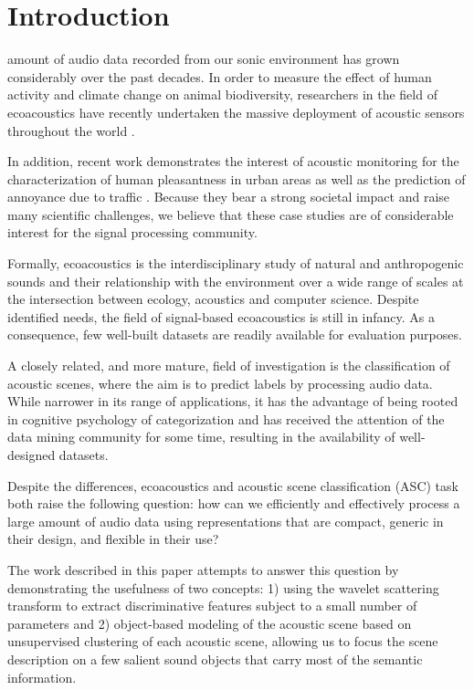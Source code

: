 \documentclass[journal]{IEEEtran}
\begin{document}
\section{Introduction}

 amount of audio data recorded from our sonic environment has grown considerably over the past decades.
In order to measure the effect of human activity and climate change on animal biodiversity, researchers in the field of ecoacoustics \cite{ECOACOUSTICS2014, krause} have recently undertaken the massive deployment of acoustic sensors throughout the world \cite{warren2006urban, NessSST13, stowell13a, stowell13b}. 

In addition, recent work demonstrates the interest of acoustic monitoring for the characterization of human pleasantness in urban areas \cite{lafayPartI, guyot2005urban, ricciardi2015sound} as well as the prediction of annoyance due to traffic \cite{gloaguen}.
Because they bear a strong societal impact and raise many scientific challenges, we believe that these case studies are of considerable interest for the signal processing community.

Formally, ecoacoustics is the interdisciplinary study of natural and anthropogenic sounds and their relationship with the environment over a wide range of scales at the intersection between ecology, acoustics and computer science. Despite identified needs, the field of signal-based ecoacoustics is still in infancy.
As a consequence, few well-built datasets are readily available for evaluation purposes.

A closely related, and more mature, field of investigation is the classification of acoustic scenes, where the aim is to predict labels by processing audio data.
While narrower in its range of applications, it has the advantage of being rooted in cognitive psychology of categorization \cite{dubois2006cognitive, maffiolo_caracterisation_1999, guastavino_ideal_2006} and has received the attention of the data mining community for some time, resulting in the availability of well-designed datasets.

Despite the differences, ecoacoustics and acoustic scene classification (ASC) task both raise the following question: how can we efficiently and effectively process a large amount of audio data using representations that are compact, generic in their design, and flexible in their use?

The work described in this paper attempts to answer this question by demonstrating the usefulness of two concepts: 1) using the wavelet scattering transform to extract discriminative features subject to a small number of parameters and 2) object-based modeling of the acoustic scene based on unsupervised clustering of each acoustic scene, allowing us to focus the scene description on a few salient sound objects that carry most of the semantic information.
\end{document}
